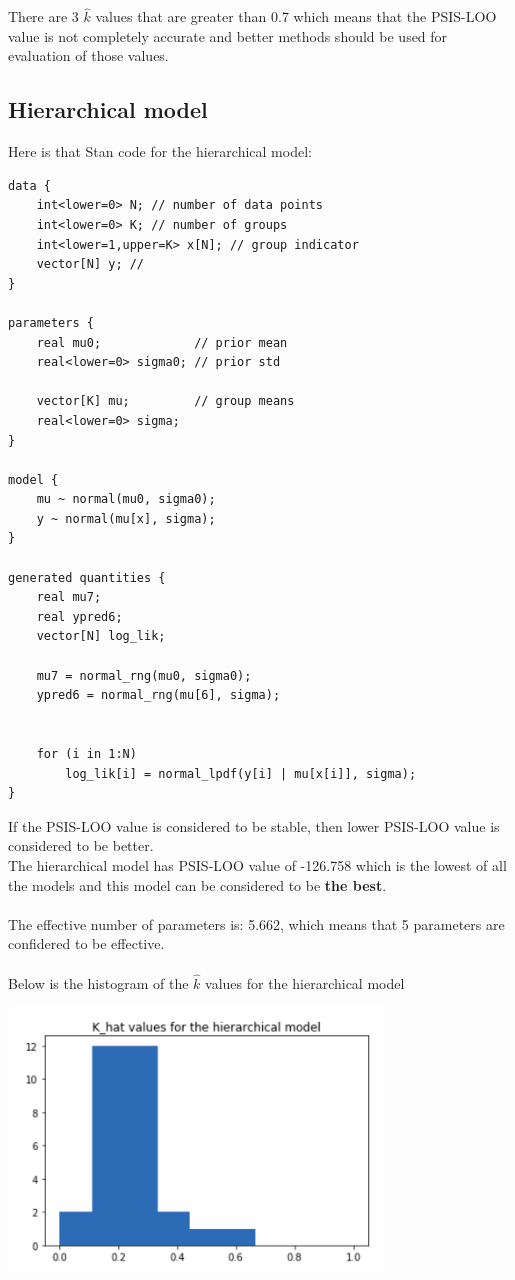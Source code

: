 \documentclass[17pt]{article}
\begin{document}
There are 3 $ \hat{k} $ values that are greater than 0.7 which means that the PSIS-LOO value is not completely accurate and better methods should be used for evaluation of those values.



\subsection{Hierarchical model}
Here is that Stan code for the hierarchical model:

\begin{lstlisting}
data {
    int<lower=0> N; // number of data points
    int<lower=0> K; // number of groups
    int<lower=1,upper=K> x[N]; // group indicator
    vector[N] y; //
}

parameters {
    real mu0;             // prior mean
    real<lower=0> sigma0; // prior std
    
    vector[K] mu;         // group means
    real<lower=0> sigma;
}

model {
    mu ~ normal(mu0, sigma0);
    y ~ normal(mu[x], sigma);
}

generated quantities {
    real mu7;
    real ypred6;
    vector[N] log_lik;
    
    mu7 = normal_rng(mu0, sigma0);
    ypred6 = normal_rng(mu[6], sigma);
    
    
    for (i in 1:N)
        log_lik[i] = normal_lpdf(y[i] | mu[x[i]], sigma);    
}
\end{lstlisting}


If the PSIS-LOO value is considered to be stable, then lower PSIS-LOO value is considered to be better. \\
The hierarchical model has PSIS-LOO value of -126.758 which is the lowest of all the models and this model can be considered to be \textbf{the best}. \\~\\

The effective number of parameters is: 5.662, which means that 5 parameters are confidered to be effective. \\~\\

Below is the histogram of the $ \hat{k} $ values for the hierarchical model

\begin{center}
\includegraphics[width=10cm, height=7cm]{hierarchical_model.png}
\end{center}
\end{document}
